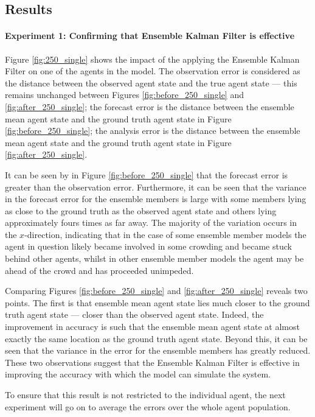 \subsection{Results}\label{sub:research:results}

\paragraph{Experiment 1: Confirming that Ensemble Kalman Filter is effective}

Figure \ref{fig:250_single} shows the impact of the applying the Ensemble Kalman
Filter on one of the agents in the model.
The observation error is considered as the distance between the observed agent
state and the true agent state --- this remains unchanged between Figures
\ref{fig:before_250_single} and \ref{fig:after_250_single}; the forecast error
is the distance between the ensemble mean agent state and the ground truth agent
state in Figure \ref{fig:before_250_single}; the analysis error is the distance
between the ensemble mean agent state and the ground truth agent state in Figure
\ref{fig:after_250_single}.

It can be seen by in Figure \ref{fig:before_250_single} that the forecast error
is greater than the observation error.
Furthermore, it can be seen that the variance in the forecast error for the
ensemble members is large with some members lying as close to the ground truth
as the observed agent state and others lying approximately fours times as far
away.
The majority of the variation occurs in the $x$-direction, indicating that in
the case of some ensemble member models the agent in question likely became
involved in some crowding and became stuck behind other agents, whilst in other
ensemble member models the agent may be ahead of the crowd and has proceeded
unimpeded.

Comparing Figures \ref{fig:before_250_single} and \ref{fig:after_250_single}
reveals two points.
The first is that ensemble mean agent state lies much closer to the ground truth
agent state --- closer than the observed agent state.
Indeed, the improvement in accuracy is such that the ensemble mean agent state
at almost exactly the same location as the ground truth agent state.
Beyond this, it can be seen that the variance in the error for the ensemble
members has greatly reduced.
These two observations suggest that the Ensemble Kalman Filter is effective in
improving the accuracy with which the model can simulate the system.

To ensure that this result is not restricted to the individual agent, the next
experiment will go on to average the errors over the whole agent population.

